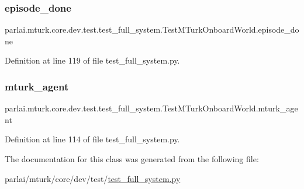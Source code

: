 \subsubsection{\texorpdfstring{episode\+\_\+done}{episode\_done}}
{\footnotesize\ttfamily parlai.\+mturk.\+core.\+dev.\+test.\+test\+\_\+full\+\_\+system.\+Test\+M\+Turk\+Onboard\+World.\+episode\+\_\+done}



Definition at line 119 of file test\+\_\+full\+\_\+system.\+py.

\mbox{\label{classparlai_1_1mturk_1_1core_1_1dev_1_1test_1_1test__full__system_1_1TestMTurkOnboardWorld_a57ab0490a71d0e7df3aeaf7d9d162dc9}} 
\subsubsection{\texorpdfstring{mturk\+\_\+agent}{mturk\_agent}}
{\footnotesize\ttfamily parlai.\+mturk.\+core.\+dev.\+test.\+test\+\_\+full\+\_\+system.\+Test\+M\+Turk\+Onboard\+World.\+mturk\+\_\+agent}



Definition at line 114 of file test\+\_\+full\+\_\+system.\+py.



The documentation for this class was generated from the following file\+:\begin{DoxyCompactItemize}
\item 
parlai/mturk/core/dev/test/\hyperlink{dev_2test_2test__full__system_8py}{test\+\_\+full\+\_\+system.\+py}\end{DoxyCompactItemize}
